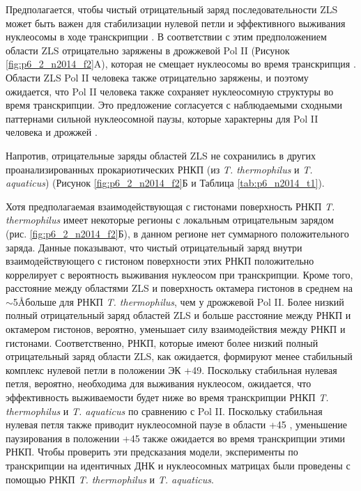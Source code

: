     Предполагается, чтобы чистый отрицательный заряд последовательности ZLS может быть важен для стабилизации нулевой петли и эффективного выживания нуклеосомы в ходе транскрипции \cite{kulaeva_mechanism_2009}. В соответствии с этим предположением области ZLS отрицательно заряжены в дрожжевой Pol II (Рисунок \ref{fig:p6_2_n2014_f2}A), которая не смещает нуклеосомы во время транскрипция \cite{kireeva_nucleosome_2002,walter_bacterial_2003}. Области ZLS Pol II человека также отрицательно заряжены, и поэтому ожидается, что Pol II человека также сохраняет нуклеосомную структуры во время транскрипции. Это предложение согласуется с наблюдаемыми сходными паттернами сильной нуклеосомной паузы, которые характерны для Pol II человека и дрожжей \cite{bondarenko_nucleosomes_2006}.
    
    Напротив, отрицательные заряды областей ZLS не сохранились в других проанализированных прокариотических РНКП (из \textit{T. thermophilus} и \textit{T. aquaticus}) (Рисунок \ref{fig:p6_2_n2014_f2}Б и Таблица \ref{tab:p6_n2014_t1}).
    
    Хотя предполагаемая взаимодействующая с гистонами поверхность РНКП \textit{T. thermophilus}  имеет некоторые регионы с локальным отрицательным зарядом (рис. \ref{fig:p6_2_n2014_f2}Б), в данном регионе нет суммарного положительного заряда. Данные показывают, что чистый отрицательный заряд внутри взаимодействующего с гистоном поверхности этих РНКП положительно коррелирует с вероятность выживания нуклеосом при транскрипции. Кроме того, расстояние между областями ZLS и поверхность октамера гистонов в среднем на $\sim$5\AA больше для РНКП \textit{T. thermophilus}, чем у дрожжевой Pol II. Более низкий полный отрицательный заряд областей ZLS и больше расстояние между РНКП и октамером гистонов, вероятно, уменьшает силу взаимодействия между РНКП и гистонами. Соответственно, РНКП, которые имеют более низкий полный отрицательный заряд области ZLS, как ожидается, формируют менее стабильный комплекс нулевой петли в положении ЭК +49. Поскольку стабильная нулевая петля, вероятно, необходима для выживания нуклеосом, ожидается, что эффективность выживаемости будет ниже во время транскрипции РНКП \textit{T. thermophilus} и \textit{T. aquaticus} по сравнению с Pol II. Поскольку стабильная нулевая петля также приводит нуклеосомной паузе в области +45 \cite{hsieh_histone_2010}, уменьшение паузирования в положении +45 также ожидается во время транскрипции этими РНКП. Чтобы проверить эти предсказания модели, эксперименты по транскрипции на идентичных ДНК и нуклеосомных матрицах были проведены с помощью РНКП \textit{T. thermophilus} и \textit{T. aquaticus}.
    
